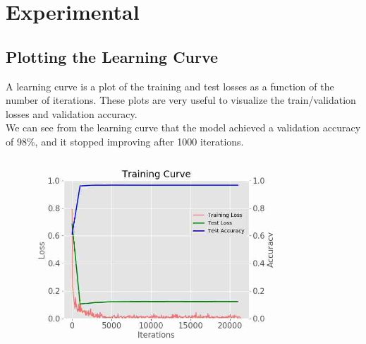\section{Experimental}

\subsection{Plotting the Learning Curve}
A learning curve is a plot of the training and test losses as a function of the number of iterations. These plots are very useful to visualize the train/validation losses and validation accuracy. \\
We can see from the learning curve that the model achieved a validation accuracy of 98\%, and it stopped improving after 1000 iterations.
\begin{figure}[H]
\centering
\includegraphics[width=0.8\textwidth]{images/trainningcurve.jpg}
\end{figure}

